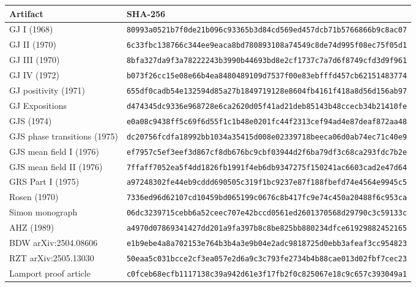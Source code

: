 \documentclass[10pt,a4paper]{article}
\begin{document}
\newcommand{\hashvalue}[2]{\texttt{#1}\newline\texttt{#2}}
\begin{longtable}{P{4.0cm}P{10.0cm}}
\toprule
Artifact & SHA-256\\
\midrule
\endhead
GJ I (1968) & \hashvalue{80993a0521b7f0de21b096c93365b3d8}{4cd569ed457dcb71b5766866b9c8ac07}\\
GJ II (1970) & \hashvalue{6c33fbc138766c344ee9eaca8bd78089}{3108a74549c8de74d995f08ec75f05d1}\\
GJ III (1970) & \hashvalue{8bfa327da9f3a78222243b3990b44693}{bd8e2cf1737c7a7d6f8749cfd3d9f961}\\
GJ IV (1972) & \hashvalue{b073f26cc15e08e66b4ea8480489109d}{7537f00e83ebfffd457cb62151483774}\\
GJ positivity (1971) & \hashvalue{655df0cadb54e132594d85a27b184971}{9128e8604fb4161f418a8d56d156ab97}\\
GJ Expositions & \hashvalue{d474345dc9336e968728e6ca2620d05f}{41ad21deb85143b48ccecb34b21410fe}\\
GJS (1974) & \hashvalue{e0a08c9438ff5c69f6d55f1c1b48e02}{01fc44f2313cef94ad4e87deaf872aa48}\\
GJS phase transitions (1975) & \hashvalue{dc20756fcdfa18992bb1034a35415d008}{e02339718beeca06d0ab74ec71c40e9}\\
GJS mean field I (1976) & \hashvalue{ef7957c5ef3eef3d867cf8db676bc9cb}{f03944d2f6ba79df3c68ca293fdc7b2e}\\
GJS mean field II (1976) & \hashvalue{7ffaff7052ea5f4dd1826fb1991f4eb6}{db9347275f150241ac6603cad2e47d64}\\
GRS Part I (1975) & \hashvalue{a97248302fe44eb9cddd690505c319f1}{bc9237e87f188fbefd74e4564e9945c5}\\
Rosen (1970) & \hashvalue{7336ed96d62107cd10459bd065199c06}{76c8b417fc9e74c450a20488f6c953ca}\\
Simon monograph & \hashvalue{06dc3239715cebb6a52ceec707e42bcc}{d0561ed2601370568d29790c3c59133c}\\
AHZ (1989) & \hashvalue{a4970d07869341427dd201a9fa397b8c}{8be825bb880234dfce61929882452165}\\
BDW arXiv:2504.08606 & \hashvalue{e1b9ebe4a8a702153e764b3b4a3e9b04}{e2adc9818725d0ebb3afeaf3cc954823}\\
RZT arXiv:2505.13030 & \hashvalue{50eaa5c031bcce2cf3ea057e2d6a9c3}{c793fe2734b4b88cae013d02fbf7cec23}\\
Lamport proof article & \hashvalue{c0fceb68ecfb1117138c39a942d61e3f}{17fb2f0c825067e18c9c657c393049a1}\\
\bottomrule
\end{longtable}
\end{document}
